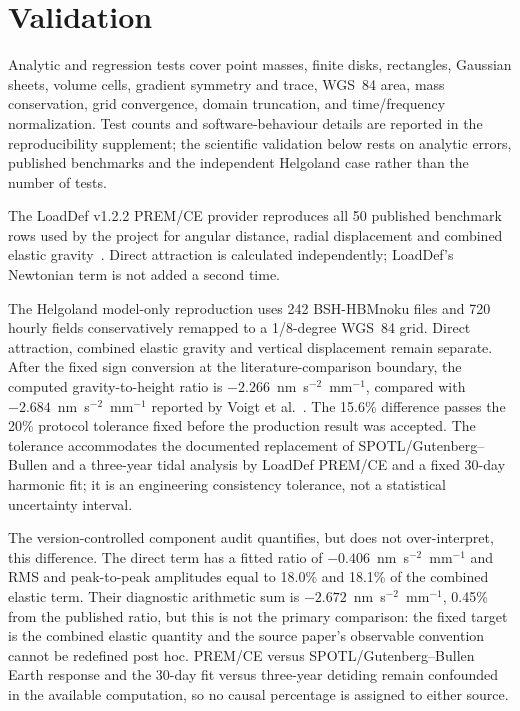 \documentclass[11pt]{article}
\begin{document}
\section{Validation}
Analytic and regression tests cover point masses, finite disks, rectangles,
Gaussian sheets,
volume cells, gradient symmetry and trace, WGS~84 area, mass conservation, grid
convergence, domain truncation, and time/frequency normalization. Test counts and
software-behaviour details are reported in the reproducibility supplement; the
scientific validation below rests on analytic errors, published benchmarks and
the independent Helgoland case rather than the number of tests.

The LoadDef v1.2.2 PREM/CE provider reproduces all 50 published benchmark rows
used by the project for angular distance, radial displacement and combined
elastic gravity~\cite{Martens2019}. Direct attraction is calculated independently;
LoadDef's Newtonian term is not added a second time.

The Helgoland model-only reproduction uses 242 BSH-HBMnoku files and 720 hourly
fields conservatively remapped to a 1/8-degree WGS~84 grid. Direct attraction,
combined elastic gravity and vertical displacement remain separate. After the
fixed sign conversion at the literature-comparison boundary, the computed
gravity-to-height ratio is $-2.266$~nm~s$^{-2}$~mm$^{-1}$, compared with
$-2.684$~nm~s$^{-2}$~mm$^{-1}$ reported by Voigt et
al.~\cite{Voigt2024}. The 15.6\% difference passes the 20\% protocol tolerance
fixed before the production result was accepted. The tolerance accommodates
the documented replacement of SPOTL/Gutenberg--Bullen and a three-year tidal
analysis by LoadDef PREM/CE and a fixed 30-day harmonic fit; it is an engineering
consistency tolerance, not a statistical uncertainty interval.

The version-controlled component audit quantifies, but does not over-interpret, this
difference. The direct term has a fitted ratio of
$-0.406$~nm~s$^{-2}$~mm$^{-1}$ and RMS and peak-to-peak amplitudes equal to
18.0\% and 18.1\% of the combined elastic term. Their diagnostic arithmetic sum
is $-2.672$~nm~s$^{-2}$~mm$^{-1}$, 0.45\% from the published ratio, but this is
not the primary comparison: the fixed target is the combined elastic
quantity and the source paper's observable convention cannot be redefined
post hoc. PREM/CE versus SPOTL/Gutenberg--Bullen Earth response and the 30-day
fit versus three-year detiding remain confounded in the available computation,
so no causal percentage is assigned to either source.
\end{document}
